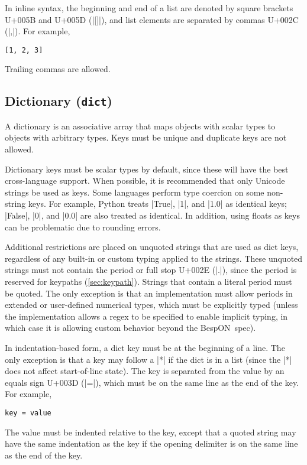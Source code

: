 \documentclass[11pt]{article}
\newcommand{\bespon}{BespON}
\begin{document}
In inline syntax, the beginning and end of a list are denoted by square brackets U+005B and U+005D (|[]|), and list elements are separated by commas U+002C (|,|).  For example,
\begin{Verbatim}
[1, 2, 3]
\end{Verbatim}
Trailing commas are allowed.


\subsection{Dictionary (\texttt{dict})}
\label{sec:type:dict}

A dictionary is an associative array that maps objects with scalar types to objects with arbitrary types.  Keys must be unique and duplicate keys are not allowed.

Dictionary keys must be scalar types by default, since these will have the best cross-language support.  When possible, it is recommended that only Unicode strings be used as keys.  Some languages perform type coercion on some non-string keys.  For example, Python treats |True|, |1|, and |1.0| as identical keys; |False|, |0|, and |0.0| are also treated as identical.  In addition, using floats as keys can be problematic due to rounding errors.

Additional restrictions are placed on unquoted strings that are used as dict keys, regardless of any built-in or custom typing applied to the strings.  These unquoted strings must not contain the period or full stop U+002E (|.|), since the period is reserved for keypaths (\cref{sec:keypath}).  Strings that contain a literal period must be quoted.  The only exception is that an implementation must allow periods in extended or user-defined numerical types, which must be explicitly typed (unless the implementation allows a regex to be specified to enable implicit typing, in which case it is allowing custom behavior beyond the \bespon\ spec).

In indentation-based form, a dict key must be at the beginning of a line.  The only exception is that a key may follow a |*| if the dict is in a list (since the |*| does not affect start-of-line state).  The key is separated from the value by an equals sign U+003D (|=|), which must be on the same line as the end of the key.  For example,
\begin{Verbatim}
key = value
\end{Verbatim}
The value must be indented relative to the key, except that a quoted string may have the same indentation as the key if the opening delimiter is on the same line as the end of the key.
\end{document}
